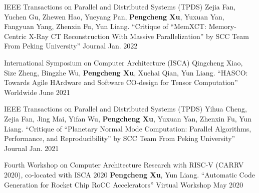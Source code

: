 


\begin{cventries}

  \cventry
    {IEEE Transactions on Parallel and Distributed Systems (TPDS)}
    {{\normalfont Zejia Fan, Yuchen Gu, Zhewen Hao, Yueyang Pan, \textbf{Pengcheng Xu}, Yuxuan Yan, Fangyuan Yang, Zhenxin Fu, Yun Liang. ``Critique of “MemXCT: Memory-Centric X-Ray CT Reconstruction With Massive Parallelization” by SCC Team From Peking University''}}
    {Journal} %
    {Jan. 2022} %
    {}

  \cventry
    {International Symposium on Computer Architecture (ISCA)}
    {{\normalfont Qingcheng Xiao, Size Zheng, Bingzhe Wu, \textbf{Pengcheng Xu}, Xuehai Qian, Yun Liang. ``HASCO: Towards Agile HArdware and Software CO-design for Tensor Computation''}}
    {Worldwide} %
    {June 2021} %
    {}

  \cventry
    {IEEE Transactions on Parallel and Distributed Systems (TPDS)}
    {{\normalfont Yihua Cheng, Zejia Fan, Jing Mai, Yifan Wu, \textbf{Pengcheng Xu}, Yuxuan Yan, Zhenxin Fu, Yun Liang. ``Critique of “Planetary Normal Mode Computation: Parallel Algorithms, Performance, and Reproducibility” by SCC Team From Peking University''}}
    {Journal} %
    {Jan. 2021} %
    {}

  \cventry
    {Fourth Workshop on Computer Architecture Research with RISC-V (CARRV 2020), co-located with ISCA 2020} %
    {{\normalfont \textbf{Pengcheng Xu}, Yun Liang. ``Automatic Code Generation for Rocket Chip RoCC Accelerators''}} %
    {Virtual Workshop} %
    {May 2020} %
    {}
\end{cventries}
